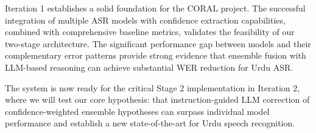 Iteration 1 establishes a solid foundation for the CORAL project. The successful integration of multiple ASR models with confidence extraction capabilities, combined with comprehensive baseline metrics, validates the feasibility of our two-stage architecture. The significant performance gap between models and their complementary error patterns provide strong evidence that ensemble fusion with LLM-based reasoning can achieve substantial WER reduction for Urdu ASR.

The system is now ready for the critical Stage 2 implementation in Iteration 2, where we will test our core hypothesis: that instruction-guided LLM correction of confidence-weighted ensemble hypotheses can surpass individual model performance and establish a new state-of-the-art for Urdu speech recognition.